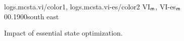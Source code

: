 
\begin{figure*}[!htp]
	\centering
	{logs.mcsta.vi/color1,
		logs.mcsta.vi-es/color2
	}
	{VI$_\textsf{m}$, VI-es$_\textsf{m}$}
	{0}{\numcommunity}{0.1}{900}{south east}
%
	\caption{Impact of essential state optimization.}
	\label{fig:essential}
\end{figure*}